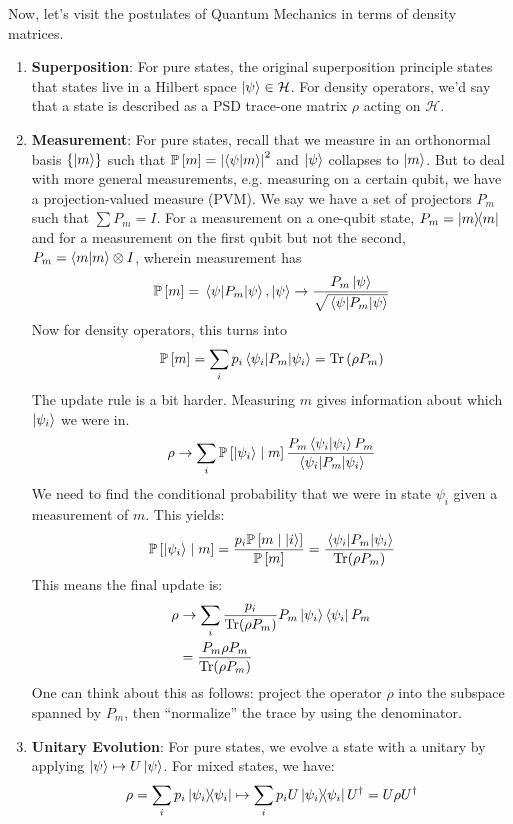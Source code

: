 Now, let's visit the postulates of Quantum Mechanics in terms of density matrices.
\begin{theorem}
    \begin{enumerate}
    \item \textbf{Superposition}: For pure states, the original superposition principle states that states live in a Hilbert space $\ket{\psi} \in \mathcal{H}$. For density operators,
    we'd say that a state is described as a PSD trace-one matrix $\rho$ acting on $\mathcal{H}$.
    \item \textbf{Measurement}: For pure states, recall that we measure in an orthonormal basis $\{\ket{m}\}$ such that
    $\mathbb{P}\left[ m \right] = \qty|\braket{\psi}{m}|^2$ and $\ket{\psi}$ collapses to $\ket{m}$. But to deal with more general measurements,
    e.g. measuring on a certain qubit, we have a projection-valued measure (PVM). We say we have a set of projectors
    $P_m$ such that $\sum P_m = I$. For a measurement on a one-qubit state, $P_m = \ketbra{m}{m}$ and for a measurement on the first qubit but not the second,
    $P_m = \braket{m}{m} \otimes I$, wherein measurement has
    \[ \mathbb{P}\left[ m \right] = \mel{\psi}{P_m}{\psi}, \ket{\psi} \to \frac{P_m \ket{\psi}}{\sqrt{\mel{\psi}{P_m}{\psi}}} \]
    Now for density operators, this turns into
    \[ \mathbb{P}\left[ m \right] = \sum_i p_i \mel{\psi_i}{P_m}{\psi_i} = \Tr\qty(\rho P_m) \]
    The update rule is a bit harder. Measuring $m$ gives information about which $\ket{\psi_i}$ we were in.
    \[ \rho \to \sum_i \mathbb{P}\left[ \ket{\psi_i} \mid m \right] \frac{P_m \bra{\psi_i} \ket{\psi_i} P_m}{\mel{\psi_i}{P_m}{\psi_i}} \]
    We need to find the conditional probability that we were in state $\psi_i$ given a measurement of $m$. This yields:
    \[ \mathbb{P}\left[ \ket{\psi_i} \mid m \right] = \frac{p_i \mathbb{P}\left[ m \mid \ket{i} \right]}{\mathbb{P}\left[ m \right]} = \frac{\mel{\psi_i}{P_m}{\psi_i}}{\Tr(\rho P_m)} \]
    This means the final update is:
    \begin{align*}
        \rho &\to \sum_{i} \frac{p_i}{\Tr(\rho P_m)} P_m \ket{\psi_i} \bra{\psi_i} P_m \\
        &= \frac{P_m \rho P_m}{\Tr(\rho P_m)}
    \end{align*}
    One can think about this as follows: project the operator $\rho$ into the subspace spanned by $P_m$,
    then ``normalize'' the trace by using the denominator.
    \item \textbf{Unitary Evolution}: For pure states, we evolve a state with a unitary by applying $\ket{\psi} \mapsto U\ket{\psi}$. For mixed states, we have:
    \[ \rho = \sum_i p_i \ketbra{\psi_i}{\psi_i} \mapsto \sum_i p_i U \ketbra{\psi_i}{\psi_i} U^{\dagger} = U \rho U^{\dagger} \]
    \end{enumerate}
\end{theorem}

